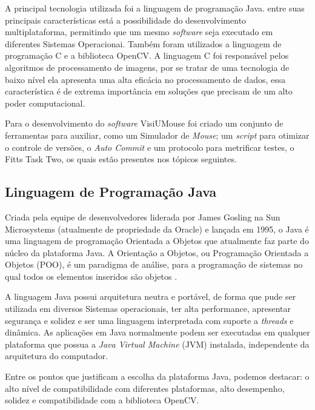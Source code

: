 
A principal tecnologia utilizada foi a linguagem de programação Java. entre suas principais características está a possibilidade do desenvolvimento multiplataforma, permitindo que um mesmo \textit{software} seja executado em diferentes Sistemas Operacionai. Também foram utilizados a linguagem de programação C e a biblioteca OpenCV. A linguagem C foi responsável pelos algoritmos de processamento de imagens, por se tratar de uma tecnologia de baixo nível ela apresenta uma alta eficácia no processamento de dados, essa característica é de extrema importância em soluções que precisam de um alto poder computacional.

Para o desenvolvimento do \textit{software} VisiUMouse foi criado um conjunto de ferramentas para auxiliar, como um Simulador de \textit{Mouse}; um \textit{script} para otimizar o controle de versões, o \textit{Auto Commit} e um protocolo para metrificar testes, o Fitts Task Two, os quais estão presentes nos tópicos seguintes.

\subsection{Linguagem de Programação Java}

Criada pela equipe de desenvolvedores liderada por James Gosling na Sun Microsystems (atualmente de propriedade da Oracle) e lançada em 1995, o Java é uma linguagem de programação Orientada a Objetos que atualmente faz parte do núcleo da plataforma Java. A Orientação a Objetos, ou Programação Orientada a Objetos (POO), é um paradigma de análise, para a programação de sistemas no qual todos os elementos inseridos são objetos \cite{urma2014java}.

A linguagem Java possui arquitetura neutra e portável, de forma que pude ser utilizada em diversos Sistemas operacionais, ter alta performance, apresentar segurança e solidez e ser uma linguagem interpretada com suporte a \textit{threads} e dinâmica. As aplicações em Java normalmente podem ser executadas em qualquer plataforma que possua a \textit{Java Virtual Machine} (JVM) instalada, independente da arquitetura do computador.

Entre os pontos que justificam a escolha da plataforma Java, podemos destacar: o alto nível de compatibilidade com diferentes plataformas, alto desempenho, solidez e compatibilidade com a biblioteca OpenCV.

